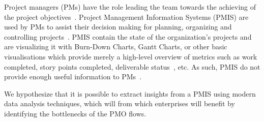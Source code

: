 \documentclass[a4paper, 12pt]{article}
\begin{document}

Project managers (PMs) have the role leading the team towards the achieving of the project objectives~\cite{institute2017guide}. Project Management Information Systems (PMIS) are used by PMs to assist their decision making for planning, organizing and controlling projects~\cite{CANIELS2012162}. PMIS contain the state of the organization's projects and are visualizing it with Burn-Down Charts, Gantt Charts, or other basic visualisations which provide merely a high-level overview of metrics such as work completed, story points completed, deliverable status~\cite{institute2017guide}, etc. As such, PMIS do not provide enough useful information to PMs~\cite{CANIELS2012162}. 

We hypothesize that it is possible to extract insights from a PMIS using modern data analysis techniques, which will  from which enterprises will benefit by identifying the bottlenecks of the PMO flows.




\end{document}
